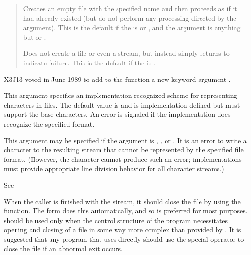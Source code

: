 \begin{defun}[Function]
\begin{flushdesc}
\begin{quotation}
\begin{flushdesc}
\item[\cd{:create}]
Creates an empty file with the specified name and then proceeds as if it
had already existed (but do not perform any processing directed by the
 argument).
This is the default if the  is 
or , and the  argument is anything but 
or .

\item[\cd{\false}]
Does not create a file or even a stream, but
instead simply returns {\false} to indicate failure.
This is the default if the  is .
\end{flushdesc}
\end{quotation}
\end{flushdesc}

\begin{newer}
X3J13 voted in June 1989 
to add to the function  a new keyword argument .
\begin{flushdesc}
\item[\cd{:external-format}]
This argument specifies an implementation-recognized scheme for
representing characters in files.  The default value is 
and is implementation-defined but must support the base characters.
An error is signaled if the implementation does recognize the specified format.

This argument may be specified if the  argument is
, , or .  It is an error to write a character
to the resulting stream that cannot be represented by the specified file format.
(However, the  character cannot produce such an error;
implementations must provide appropriate line division behavior for all character
streams.)

See .
\end{flushdesc}
\end{newer}

When the caller is finished with the stream, it should close the file by
using the  function.  The 
form does this automatically, and so is preferred for most purposes.
 should be used only when the control structure of the program
necessitates opening and closing of a file in some way more complex than
provided by .  It is suggested that any program that uses
 directly should use the special operator  to
close the file if an abnormal exit occurs.
\end{defun}

